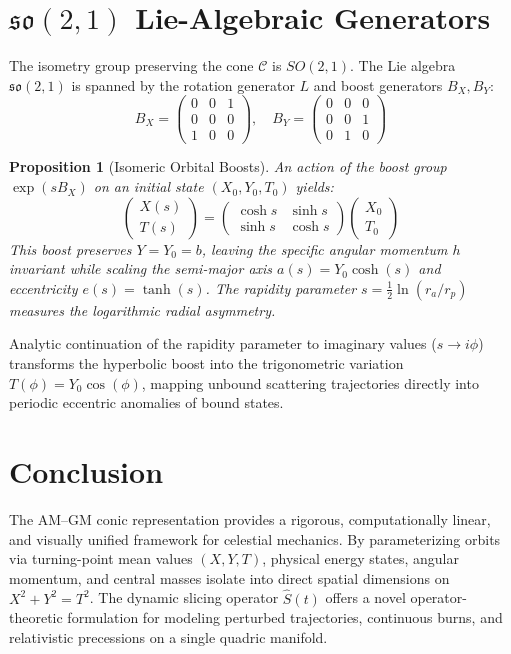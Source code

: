 \documentclass[11pt,3p,twocolumn]{elsarticle}
\newtheorem{proposition}[theorem]{Proposition}
\begin{document}
\section{$\mathfrak{so}(2,1)$ Lie-Algebraic Generators}

The isometry group preserving the cone $\mathcal{C}$ is $SO(2,1)$. The Lie algebra $\mathfrak{so}(2,1)$ is spanned by the rotation generator $L$ and boost generators $B_X, B_Y$:
\begin{equation}
B_X = \begin{pmatrix} 0 & 0 & 1 \\ 0 & 0 & 0 \\ 1 & 0 & 0 \end{pmatrix}, \quad 
B_Y = \begin{pmatrix} 0 & 0 & 0 \\ 0 & 0 & 1 \\ 0 & 1 & 0 \end{pmatrix}
\end{equation}

\begin{proposition}[Isomeric Orbital Boosts]
An action of the boost group $\exp(s B_X)$ on an initial state $(X_0, Y_0, T_0)$ yields:
\begin{equation}
\begin{pmatrix} X(s) \\ T(s) \end{pmatrix} = \begin{pmatrix} \cosh s & \sinh s \\ \sinh s & \cosh s \end{pmatrix} \begin{pmatrix} X_0 \\ T_0 \end{pmatrix}
\end{equation}
This boost preserves $Y = Y_0 = b$, leaving the specific angular momentum $h$ invariant while scaling the semi-major axis $a(s) = Y_0 \cosh(s)$ and eccentricity $e(s) = \tanh(s)$. The rapidity parameter $s = \frac{1}{2}\ln(r_a/r_p)$ measures the logarithmic radial asymmetry.
\end{proposition}

Analytic continuation of the rapidity parameter to imaginary values ($s \to i\phi$) transforms the hyperbolic boost into the trigonometric variation $T(\phi) = Y_0 \cos(\phi)$, mapping unbound scattering trajectories directly into periodic eccentric anomalies of bound states.

\section{Conclusion}
The AM--GM conic representation provides a rigorous, computationally linear, and visually unified framework for celestial mechanics. By parameterizing orbits via turning-point mean values $(X, Y, T)$, physical energy states, angular momentum, and central masses isolate into direct spatial dimensions on $X^2 + Y^2 = T^2$. The dynamic slicing operator $\hat{S}(t)$ offers a novel operator-theoretic formulation for modeling perturbed trajectories, continuous burns, and relativistic precessions on a single quadric manifold.
\end{document}
